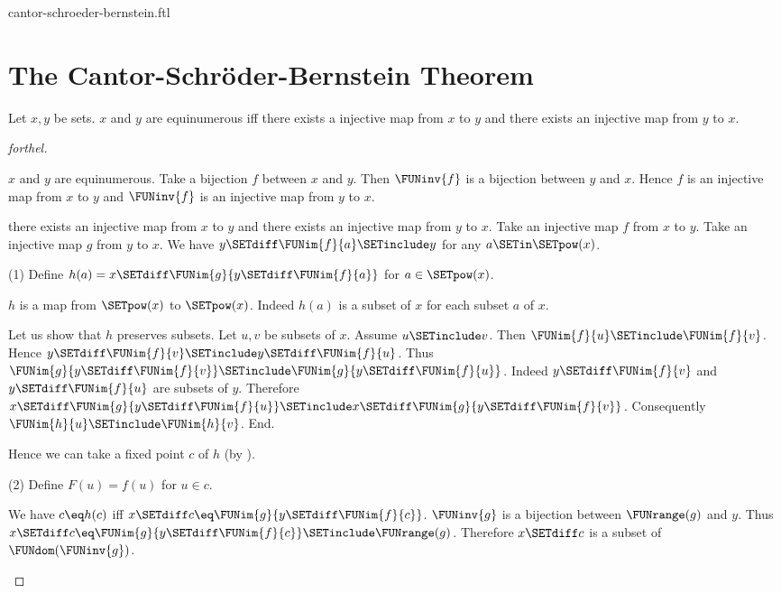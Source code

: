 \documentclass{article}
\begin{document}
\begin{smodule}{cantor-schroeder-bernstein.ftl}
\section*{The Cantor-Schröder-Bernstein Theorem}

\begin{theorem}[forthel,title=Cantor-Schröder-Bernstein,id=cantor_schroeder_bernstein]
  Let $x,y$ be sets.
  $x$ and $y$ are equinumerous iff there exists a injective map from $x$ to $y$ and there exists an injective map from $y$ to $x$.
\end{theorem}
\begin{proof}[forthel]
  \begin{case}{$x$ and $y$ are equinumerous.}
    Take a bijection $f$ between $x$ and $y$.
    Then $\FUNinv{f}$ is a bijection between $y$ and $x$.
    Hence $f$ is an injective map from $x$ to $y$ and $\FUNinv{f}$ is an
    injective map from $y$ to $x$.
  \end{case}

  \begin{case}{there exists an injective map from $x$ to $y$ and there exists an injective map from $y$ to $x$.}
    Take an injective map $f$ from $x$ to $y$.
    Take an injective map $g$ from $y$ to $x$.
    We have $y \SETdiff \FUNim{f}{a} \SETinclude y$ for any $a \SETin \SETpow(x)$.

    (1) Define $h(a) = x \SETdiff \FUNim{g}{y \SETdiff \FUNim{f}{a}}$ for $a \in \SETpow(x)$.

    $h$ is a map from $\SETpow(x)$ to $\SETpow(x)$.
    Indeed $h(a)$ is a subset of $x$ for each subset $a$ of $x$.

    Let us show that $h$ preserves subsets.
      Let $u, v$ be subsets of $x$.
      Assume $u \SETinclude v$.
      Then $\FUNim{f}{u} \SETinclude \FUNim{f}{v}$.
      Hence $y \SETdiff \FUNim{f}{v} \SETinclude y \SETdiff \FUNim{f}{u}$.
      Thus $\FUNim{g}{y \SETdiff \FUNim{f}{v}} \SETinclude \FUNim{g}{y \SETdiff \FUNim{f}{u}}$.
      Indeed $y \SETdiff \FUNim{f}{v}$ and $y \SETdiff \FUNim{f}{u}$ are subsets of $y$.
      Therefore $x \SETdiff \FUNim{g}{y \SETdiff \FUNim{f}{u}} \SETinclude x \SETdiff \FUNim{g}{y \SETdiff \FUNim{f}{v}}$.
      Consequently $\FUNim{h}{u} \SETinclude \FUNim{h}{v}$.
    End.

    Hence we can take a fixed point $c$ of $h$ (by ).

    (2) Define $F(u) = f(u)$ for $u \in c$.

    We have $c \eq h(c)$ iff $x \SETdiff c \eq \FUNim{g}{y \SETdiff \FUNim{f}{c}}$.
    $\FUNinv{g}$ is a bijection between $\FUNrange(g)$ and $y$.
    Thus $x \SETdiff c \eq \FUNim{g}{y \SETdiff \FUNim{f}{c}} \SETinclude \FUNrange(g)$.
    Therefore $x \SETdiff c$ is a subset of $\FUNdom(\FUNinv{g})$.


\end{case}
\end{proof}
\end{smodule}
\end{document}
